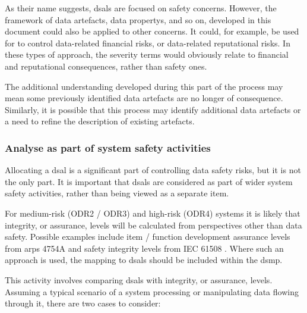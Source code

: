 As their name suggests, \glspl{dsal} are focused on safety concerns. However, the framework of \glspl{data artefact}, \glspl{data property}, and so on, developed in this document could also be applied to other concerns. It could, for example, be used for to control data-related financial risks, or data-related reputational risks. In these types of approach, the severity terms would obviously relate to financial and reputational consequences, rather than safety ones.

The additional understanding developed during this part of the process may mean some previously identified \glspl{data artefact} are no longer of consequence. Similarly, it is possible that this process may identify additional \glspl{data artefact} or a need to refine the description of existing artefacts.

\subsubsection{Analyse  as part of system safety activities}
\label{bkm:activities:analyse:partofsystemsafetyactivities}
Allocating a \gls{dsal} is a significant part of controlling data safety risks, but it is not the only part. It is important that \glspl{dsal} are considered as part of wider system safety activities, rather than being viewed as a separate item.

For medium-risk (ODR2 / ODR3) and high-risk (ODR4) systems it is likely that \gls{integrity}, or assurance, levels will be calculated from perspectives other than data safety. Possible examples include item / function development assurance levels from \glspl{arp} 4754A \cite{citation:arp4754a2010guidelines} and safety \gls{integrity} levels from IEC 61508 \cite{citation:iec615083}.
Where such an approach is used, the mapping to \glspl{dsal} should be included within the \gls{dsmp}.

This activity involves comparing \glspl{dsal} with \gls{integrity}, or assurance, levels. Assuming a typical scenario of a system processing or manipulating data flowing through it, there are two cases to consider:

